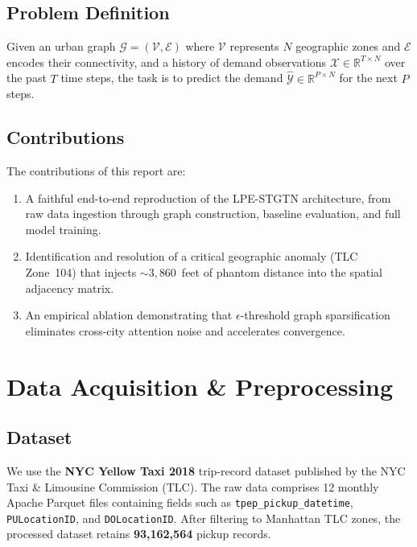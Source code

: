 \documentclass{rapportECL}
\begin{document}
\subsection{Problem Definition}
Given an urban graph $\mathcal{G} = (\mathcal{V}, \mathcal{E})$ where $\mathcal{V}$ represents $N$ geographic zones and $\mathcal{E}$ encodes their connectivity, and a history of demand observations $\mathcal{X} \in \mathbb{R}^{T \times N}$ over the past $T$ time steps, the task is to predict the demand $\hat{\mathcal{Y}} \in \mathbb{R}^{P \times N}$ for the next $P$ steps.

\subsection{Contributions}
The contributions of this report are:
\begin{enumerate}[leftmargin=*]
    \item A faithful end-to-end reproduction of the LPE-STGTN architecture, from raw data ingestion through graph construction, baseline evaluation, and full model training.
    \item Identification and resolution of a critical geographic anomaly (TLC Zone~104) that injects ${\sim}3{,}860$~feet of phantom distance into the spatial adjacency matrix.
    \item An empirical ablation demonstrating that $\epsilon$-threshold graph sparsification eliminates cross-city attention noise and accelerates convergence.
\end{enumerate}

\section{Data Acquisition \& Preprocessing}

\subsection{Dataset}
We use the \textbf{NYC Yellow Taxi 2018} trip-record dataset published by the NYC Taxi \& Limousine Commission (TLC). The raw data comprises 12 monthly Apache Parquet files containing fields such as \texttt{tpep\_pickup\_datetime}, \texttt{PULocationID}, and \texttt{DOLocationID}. After filtering to Manhattan TLC zones, the processed dataset retains \textbf{93{,}162{,}564} pickup records.
\end{document}
